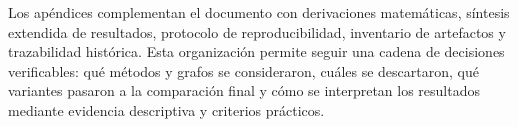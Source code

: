Los apéndices complementan el documento con derivaciones matemáticas, síntesis extendida de resultados, protocolo de reproducibilidad, inventario de artefactos y trazabilidad histórica. Esta organización permite seguir una cadena de decisiones verificables: qué métodos y grafos se consideraron, cuáles se descartaron, qué variantes pasaron a la comparación final y cómo se interpretan los resultados mediante evidencia descriptiva y criterios prácticos.

